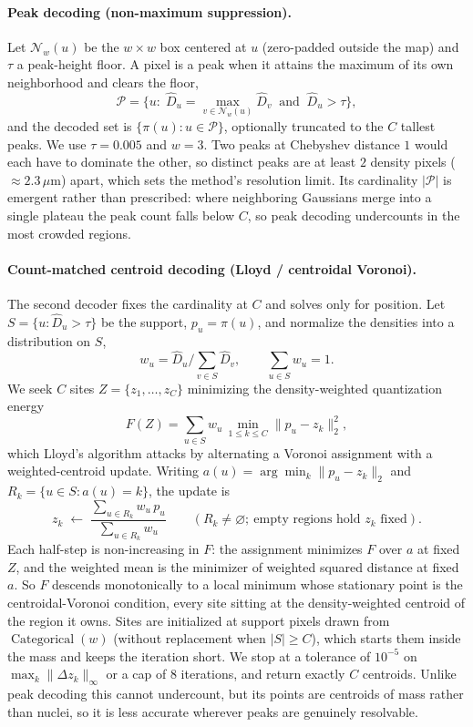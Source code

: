 \documentclass[11pt]{article}
\begin{document}
\paragraph{Peak decoding (non-maximum suppression).} Let $\mathcal{N}_w(u)$ be
the $w\times w$ box centered at $u$ (zero-padded outside the map) and $\tau$ a
peak-height floor. A pixel is a peak when it attains the maximum of its own
neighborhood and clears the floor,
\[
\mathcal{P}=\Big\{u:\;\hat D_u=\max_{v\in\mathcal{N}_w(u)}\hat D_v
\;\;\text{and}\;\;\hat D_u>\tau\Big\},
\]
and the decoded set is $\{\pi(u):u\in\mathcal{P}\}$, optionally truncated to the
$C$ tallest peaks. We use $\tau=0.005$ and $w=3$. Two peaks at Chebyshev
distance $1$ would each have to dominate the other, so distinct peaks are at
least $2$ density pixels ($\approx2.3\,\mu$m) apart, which sets the method's
resolution limit. Its cardinality $|\mathcal{P}|$ is emergent rather than
prescribed: where neighboring Gaussians merge into a single plateau the peak
count falls below $C$, so peak decoding undercounts in the most crowded regions.

\paragraph{Count-matched centroid decoding (Lloyd / centroidal Voronoi).} The
second decoder fixes the cardinality at $C$ and solves only for position. Let
$S=\{u:\hat D_u>\tau\}$ be the support, $p_u=\pi(u)$, and normalize the
densities into a distribution on $S$,
\[
w_u=\hat D_u\Big/\!\!\sum_{v\in S}\hat D_v,\qquad \sum_{u\in S}w_u=1 .
\]
We seek $C$ sites $Z=\{z_1,\dots,z_C\}$ minimizing the density-weighted
quantization energy
\[
F(Z)=\sum_{u\in S} w_u\,\min_{1\le k\le C}\lVert p_u-z_k\rVert_2^2 ,
\]
which Lloyd's algorithm attacks by alternating a Voronoi assignment with a
weighted-centroid update. Writing $a(u)=\arg\min_k\lVert p_u-z_k\rVert_2$ and
$R_k=\{u\in S:a(u)=k\}$, the update is
\[
z_k\;\leftarrow\;\frac{\sum_{u\in R_k} w_u\,p_u}{\sum_{u\in R_k} w_u}
\qquad (R_k\neq\varnothing;\ \text{empty regions hold }z_k\text{ fixed}).
\]
Each half-step is non-increasing in $F$: the assignment minimizes $F$ over $a$
at fixed $Z$, and the weighted mean is the minimizer of weighted squared
distance at fixed $a$. So $F$ descends monotonically to a local minimum whose
stationary point is the centroidal-Voronoi condition, every site sitting at the
density-weighted centroid of the region it owns. Sites are initialized at
support pixels drawn from $\operatorname{Categorical}(w)$ (without replacement
when $|S|\ge C$), which starts them inside the mass and keeps the iteration
short. We stop at a tolerance of $10^{-5}$ on
$\max_k\lVert\Delta z_k\rVert_\infty$ or a cap of $8$ iterations, and return
exactly $C$ centroids. Unlike peak decoding this cannot undercount, but its
points are centroids of mass rather than nuclei, so it is less accurate wherever
peaks are genuinely resolvable.
\end{document}
